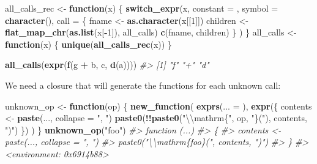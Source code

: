 \documentclass[]{book}
\newenvironment{Shaded}{\begin{snugshade}}{\end{snugshade}}
\newcommand{\CharTok}[1]{\textcolor[rgb]{0.5,0.5,0.5}{#1}}
\newcommand{\CommentTok}[1]{\textcolor[rgb]{0.37,0.37,0.37}{\textit{#1}}}
\newcommand{\ControlFlowTok}[1]{\textcolor[rgb]{0.27,0.27,0.27}{\textbf{#1}}}
\newcommand{\DataTypeTok}[1]{\textcolor[rgb]{0.27,0.27,0.27}{#1}}
\newcommand{\DecValTok}[1]{\textcolor[rgb]{0.06,0.06,0.06}{#1}}
\newcommand{\KeywordTok}[1]{\textcolor[rgb]{0.27,0.27,0.27}{\textbf{#1}}}
\newcommand{\NormalTok}[1]{#1}
\newcommand{\OperatorTok}[1]{\textcolor[rgb]{0.43,0.43,0.43}{\textbf{#1}}}
\newcommand{\StringTok}[1]{\textcolor[rgb]{0.5,0.5,0.5}{#1}}
\begin{document}
\begin{Shaded}
\begin{Highlighting}[]
\NormalTok{all_calls_rec <-}\StringTok{ }\ControlFlowTok{function}\NormalTok{(x) \{}
  \KeywordTok{switch_expr}\NormalTok{(x,}
    \DataTypeTok{constant =}\NormalTok{ ,}
    \DataTypeTok{symbol =}   \KeywordTok{character}\NormalTok{(),}
    \DataTypeTok{call =}\NormalTok{ \{}
\NormalTok{      fname <-}\StringTok{ }\KeywordTok{as.character}\NormalTok{(x[[}\DecValTok{1}\NormalTok{]])}
\NormalTok{      children <-}\StringTok{ }\KeywordTok{flat_map_chr}\NormalTok{(}\KeywordTok{as.list}\NormalTok{(x[}\OperatorTok{-}\DecValTok{1}\NormalTok{]), all_calls)}
      \KeywordTok{c}\NormalTok{(fname, children)}
\NormalTok{    \}}
\NormalTok{  )}
\NormalTok{\}}
\NormalTok{all_calls <-}\StringTok{ }\ControlFlowTok{function}\NormalTok{(x) \{}
  \KeywordTok{unique}\NormalTok{(}\KeywordTok{all_calls_rec}\NormalTok{(x))}
\NormalTok{\}}

\KeywordTok{all_calls}\NormalTok{(}\KeywordTok{expr}\NormalTok{(}\KeywordTok{f}\NormalTok{(g }\OperatorTok{+}\StringTok{ }\NormalTok{b, c, }\KeywordTok{d}\NormalTok{(a))))}
\CommentTok{#> [1] "f" "+" "d"}
\end{Highlighting}
\end{Shaded}

We need a closure that will generate the functions for each unknown call:

\begin{Shaded}
\begin{Highlighting}[]
\NormalTok{unknown_op <-}\StringTok{ }\ControlFlowTok{function}\NormalTok{(op) \{}
  \KeywordTok{new_function}\NormalTok{(}
    \KeywordTok{exprs}\NormalTok{(}\DataTypeTok{... =}\NormalTok{ ),}
    \KeywordTok{expr}\NormalTok{(\{}
\NormalTok{      contents <-}\StringTok{ }\KeywordTok{paste}\NormalTok{(..., }\DataTypeTok{collapse =} \StringTok{", "}\NormalTok{)}
      \KeywordTok{paste0}\NormalTok{(}\OperatorTok{!!}\KeywordTok{paste0}\NormalTok{(}\StringTok{"}\CharTok{\textbackslash{}\textbackslash{}}\StringTok{mathrm\{"}\NormalTok{, op, }\StringTok{"\}("}\NormalTok{), contents, }\StringTok{")"}\NormalTok{)}
\NormalTok{    \})}
\NormalTok{  )}
\NormalTok{\}}
\KeywordTok{unknown_op}\NormalTok{(}\StringTok{"foo"}\NormalTok{)}
\CommentTok{#> function (...) }
\CommentTok{#> \{}
\CommentTok{#>     contents <- paste(..., collapse = ", ")}
\CommentTok{#>     paste0("\textbackslash{}\textbackslash{}mathrm\{foo\}(", contents, ")")}
\CommentTok{#> \}}
\CommentTok{#> <environment: 0x6914b88>}
\end{Highlighting}
\end{Shaded}
\end{document}
